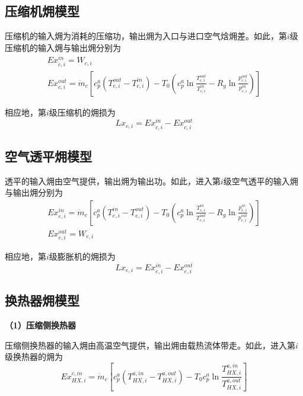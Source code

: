 \subsection{压缩机㶲模型}
压缩机的输入㶲为消耗的压缩功，输出㶲为入口与进口空气焓㶲差。如此，第$i$级压缩机的输入㶲与输出㶲分别为\cite{Eng-Thermo-83}
\begin{subequations}
\label{eq:exergy-compressor}
\begin{gather}
Ex_{c,i}^{in} = {W_{c,i}}\label{equ:comp-exergy-in}\\
Ex_{c,i}^{out} = {\dot m_c}[ {c_p^a\left( {T_{c,i}^{out} - T_{c,i}^{in}} \right) - {T_0}({c_p^a\ln \frac{{T_{c,i}^{out}}}{{T_{c,i}^{in}}} - {R_g}\ln \frac{{p_{c,i}^{out}}}{{p_{c,i}^{in}}}})}]\label{equ:comp-exergy-out}
\end{gather}
\end{subequations}

相应地，第$i$级压缩机的㶲损为
\begin{equation}
\label{equ:comp-exergy-loss}
L{x_{c,i}} = Ex_{c,i}^{in} - Ex_{c,i}^{out}
\end{equation}

\subsection{空气透平㶲模型}
透平的输入㶲由空气提供，输出㶲为输出功。如此，进入第$i$级空气透平的输入㶲与输出㶲分别为\cite{Eng-Thermo-83}
\begin{subequations}
\begin{gather}
Ex_{e,i}^{in} = {\dot m_e}[ {c_p^a( {T_{e,i}^{in} - T_{e,i}^{out}}) - {T_0}({c_p^a\ln \frac{{T_{e,i}^{in}}}{{T_{e,i}^{out}}} - {R_g}\ln \frac{{p_{e,i}^{in}}}{{p_{e,i}^{out}}}})}]\label{equ:turb-exergy-in}\\
Ex_{e,i}^{out} = {W_{e,i}}\label{equ:turb-exergy-out}
\end{gather}
\end{subequations}

相应地，第$i$级膨胀机的㶲损为
\begin{equation}
\label{equ:turb-exergy-loss}
L{x_{e,i}} = Ex_{e,i}^{in} - Ex_{e,i}^{out}
\end{equation}

\subsection{换热器㶲模型}

\textbf{（1）压缩侧换热器}

压缩侧换热器的输入㶲由高温空气提供，输出㶲由载热流体带走。如此，进入第$i$级换热器的㶲为
\begin{equation}
\label{equ:he-comp-exergy-in}
Ex_{HX,i}^{c,in} = {\dot m_c}[ {c_p^a({T_{HX,i}^{a,in} - T_{HX,i}^{a,out}}) - {T_0}c_p^a\ln \frac{{T_{HX,i}^{a,in}}}{{T_{HX,i}^{a,out}}}}]
\end{equation}

